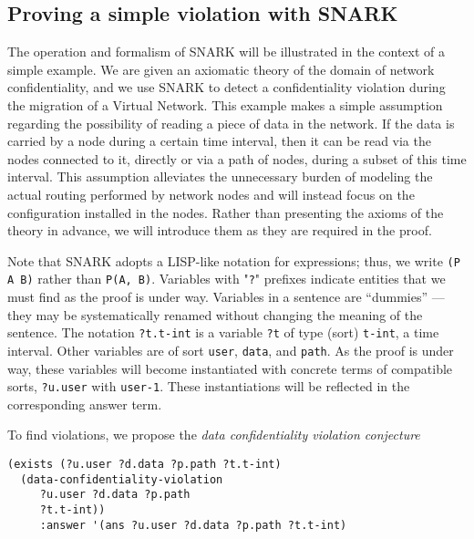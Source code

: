 
\subsection{Proving a simple violation with SNARK}
\label{sec:find-violation}
The operation and formalism of SNARK will be illustrated in the context of a simple example.
We are given an axiomatic theory of the domain of network confidentiality, and we use SNARK to detect a confidentiality violation during the migration of a Virtual Network.
This example makes a simple assumption regarding the possibility of reading a piece of data in the network. If the data is carried by a node during a certain time interval, then it can be read via the nodes connected to it, directly or via a path of nodes, during a subset of this time interval.
This assumption alleviates the unnecessary burden of modeling the actual routing performed by network nodes and will instead focus on the configuration installed in the nodes.
Rather than presenting the axioms of the theory in advance, we will introduce them as they are required in the proof.

Note that SNARK adopts a LISP-like notation for expressions; thus, we write \verb'(P A B)' rather than \verb'P(A, B)'. 
Variables with "\verb'?'" prefixes indicate entities that we must find as the proof is under way.
Variables in a sentence are ``dummies'' \---- they may be systematically renamed without changing the meaning of the sentence. 
The notation \verb'?t.t-int' is a variable \verb'?t' of type (sort) \verb't-int', \ie a time interval. 
Other variables are of sort \verb'user', \verb'data', and \verb'path'.
As the proof is under way, these variables will become instantiated with concrete terms of compatible sorts, \eg \verb'?u.user' with \verb'user-1'. 
These instantiations will be reflected in the corresponding answer term.

To find violations, we propose the \textit{data confidentiality violation conjecture}

\begin{lstlisting}[numbers=none] 
(exists (?u.user ?d.data ?p.path ?t.t-int)
  (data-confidentiality-violation 
     ?u.user ?d.data ?p.path 
     ?t.t-int))
     :answer '(ans ?u.user ?d.data ?p.path ?t.t-int)
\end{lstlisting}

